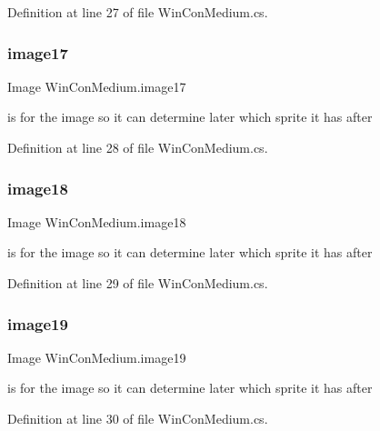 Definition at line 27 of file Win\+Con\+Medium.\+cs.

\mbox{\label{class_win_con_medium_a3b4e1470286575dfe55d58ab69183404}} 
\subsubsection{\texorpdfstring{image17}{image17}}
{\footnotesize\ttfamily Image Win\+Con\+Medium.\+image17}

is for the image so it can determine later which sprite it has after 

Definition at line 28 of file Win\+Con\+Medium.\+cs.

\mbox{\label{class_win_con_medium_a5316b9af56841f331520bb17750a039d}} 
\subsubsection{\texorpdfstring{image18}{image18}}
{\footnotesize\ttfamily Image Win\+Con\+Medium.\+image18}

is for the image so it can determine later which sprite it has after 

Definition at line 29 of file Win\+Con\+Medium.\+cs.

\mbox{\label{class_win_con_medium_a66372c51e63d257dd5cc7ad3ab1fb748}} 
\subsubsection{\texorpdfstring{image19}{image19}}
{\footnotesize\ttfamily Image Win\+Con\+Medium.\+image19}

is for the image so it can determine later which sprite it has after 

Definition at line 30 of file Win\+Con\+Medium.\+cs.

\mbox{\label{class_win_con_medium_a246064312a557bf3d219d94087dd4a7c}} 
